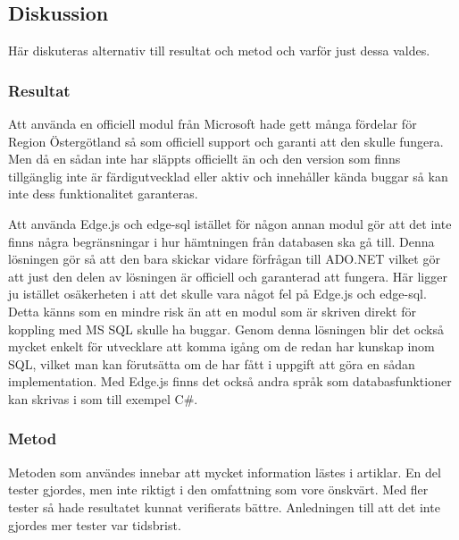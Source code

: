 \subsection{Diskussion}
Här diskuteras alternativ till resultat och metod och varför just dessa valdes.
\subsubsection{Resultat}
Att använda en officiell modul från Microsoft hade gett många fördelar för Region Östergötland så som officiell support och garanti att den skulle fungera. Men då en sådan inte har släppts officiellt än och den version som finns tillgänglig inte är färdigutvecklad eller aktiv \cite{sqlGit} och innehåller kända buggar \cite{sqlBugs} så kan inte dess funktionalitet garanteras. 

Att använda Edge.js och edge-sql istället för någon annan modul gör att det inte finns några begränsningar i hur hämtningen från databasen ska gå till. Denna lösningen gör så att den bara skickar vidare förfrågan till ADO.NET vilket gör att just den delen av lösningen är officiell och garanterad att fungera. Här ligger ju istället osäkerheten i att det skulle vara något fel på Edge.js och edge-sql. Detta känns som en mindre risk än att en modul som är skriven direkt för koppling med MS SQL skulle ha buggar.
Genom denna lösningen blir det också mycket enkelt för utvecklare att komma igång om de redan har kunskap inom SQL, vilket man kan förutsätta om de har fått i uppgift att göra en sådan implementation. Med Edge.js finns det också andra språk som databasfunktioner kan skrivas i som till exempel C\#. 

\subsubsection{Metod}
Metoden som användes innebar att mycket information lästes i artiklar. En del tester gjordes, men inte riktigt i den omfattning som vore önskvärt. Med fler tester så hade resultatet kunnat verifierats bättre. Anledningen till att det inte gjordes mer tester var tidsbrist.

